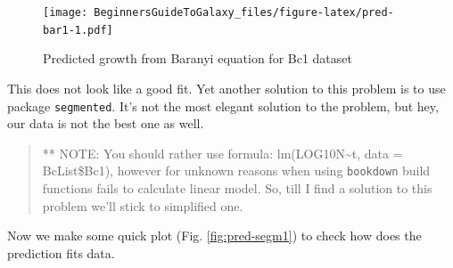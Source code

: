 \documentclass[]{book}
\newenvironment{Shaded}{\begin{snugshade}}{\end{snugshade}}
\newcommand{\KeywordTok}[1]{\textcolor[rgb]{0.13,0.29,0.53}{\textbf{#1}}}
\newcommand{\DataTypeTok}[1]{\textcolor[rgb]{0.13,0.29,0.53}{#1}}
\newcommand{\DecValTok}[1]{\textcolor[rgb]{0.00,0.00,0.81}{#1}}
\newcommand{\StringTok}[1]{\textcolor[rgb]{0.31,0.60,0.02}{#1}}
\newcommand{\OperatorTok}[1]{\textcolor[rgb]{0.81,0.36,0.00}{\textbf{#1}}}
\newcommand{\NormalTok}[1]{#1}
\theoremstyle{definition}
\theoremstyle{definition}
\theoremstyle{definition}
\theoremstyle{remark}
\begin{document}
\begin{figure}
\centering
\texttt{[image: BeginnersGuideToGalaxy\_files/figure-latex/pred-bar1-1.pdf]}
\caption{\label{fig:pred-bar1}Predicted growth from Baranyi equation for Bc1
dataset}
\end{figure}

This does not look like a good fit. Yet another solution to this problem
is to use package \texttt{segmented}. It's not the most elegant solution
to the problem, but hey, our data is not the best one as well.

\begin{Shaded}
\end{Shaded}

\begin{quote}
** NOTE: You should rather use formula: lm(LOG10N\textasciitilde{}t,
data = BcList\$Bc1), however for unknown reasons when using
\texttt{bookdown} build functions fails to calculate linear model. So,
till I find a solution to this problem we'll stick to simplified one.
\end{quote}

Now we make some quick plot (Fig. \ref{fig:pred-segm1}) to check how
does the prediction fits data.

\begin{Shaded}
\end{Shaded}
\end{document}
